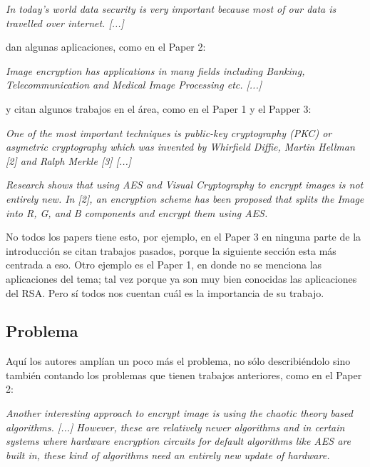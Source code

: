 \documentclass[a4paper,12pt]{article}
\begin{document}
\textit{In today’s world data security is very important because
most of our data is travelled over internet. [...]} \par

dan algunas aplicaciones, como en el Paper 2: \par

\textit{Image
encryption has applications in many fields including Banking,
Telecommunication and Medical Image Processing etc. [...]} \par

y citan algunos trabajos en el área, como en el Paper 1 y el Papper 3: \par

\textit{One of the most important techniques is public-key cryptography (PKC)
or asymetric cryptography which was invented by Whirfield Diffie, Martin Hellman [2]
and Ralph Merkle [3] [...]} \par

\textit{Research shows that using AES and Visual Cryptography to
encrypt images is not entirely new. In [2], an encryption
scheme has been proposed that splits the Image into R, G, and
B components and encrypt them using AES.} \par

No todos los papers tiene esto, por ejemplo, en el Paper 3 en ninguna parte de la introducción se citan trabajos pasados, porque
la siguiente sección esta más centrada a eso. Otro ejemplo es el Paper 1, en donde no se menciona las aplicaciones del tema;
tal vez porque ya son muy bien conocidas las aplicaciones del RSA. Pero sí todos nos cuentan cuál es la importancia de su trabajo.

\subsection{Problema}

Aquí los autores amplían un poco más el problema, no sólo describiéndolo sino también contando los problemas que tienen
trabajos anteriores, como en el Paper 2: \par

\textit{Another interesting approach to encrypt image is
using the chaotic theory based algorithms. [...] However, these are relatively
newer algorithms and in certain systems where hardware
encryption circuits for default algorithms like AES are built in,
these kind of algorithms need an entirely new update of hardware.} \par
\end{document}
